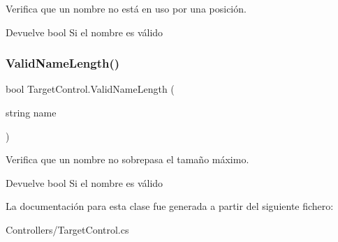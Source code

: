 Verifica que un nombre no está en uso por una posición. \begin{DoxyReturn}{Devuelve}
bool Si el nombre es válido 
\end{DoxyReturn}
\mbox{\label{class_target_control_a87d8a6a4fdf71334afd9e5d5c6204f90}} 
\subsubsection{\texorpdfstring{ValidNameLength()}{ValidNameLength()}}
{\footnotesize\ttfamily bool Target\+Control.\+Valid\+Name\+Length (\begin{DoxyParamCaption}\item[{string}]{name }\end{DoxyParamCaption})\hspace{0.3cm}{\ttfamily [inline]}}

Verifica que un nombre no sobrepasa el tamaño máximo. \begin{DoxyReturn}{Devuelve}
bool Si el nombre es válido 
\end{DoxyReturn}


La documentación para esta clase fue generada a partir del siguiente fichero\+:\begin{DoxyCompactItemize}
\item 
Controllers/Target\+Control.\+cs\end{DoxyCompactItemize}
